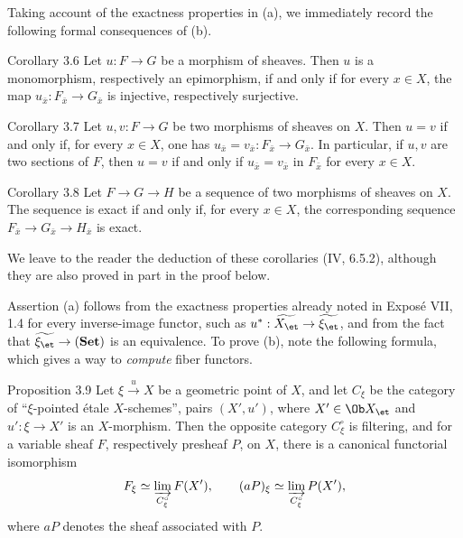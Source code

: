 Taking account of the exactness properties in (a), we immediately record the following formal consequences of (b).

\begin{statement}{Corollary 3.6}
Let \(u:F\to G\) be a morphism of sheaves. Then \(u\) is a monomorphism, respectively an epimorphism, if and only if for every \(x\in X\), the map \(u_{\bar x}:F_{\bar x}\to G_{\bar x}\) is injective, respectively surjective.
\end{statement}

\begin{statement}{Corollary 3.7}
Let \(u,v:F\to G\) be two morphisms of sheaves on \(X\). Then \(u=v\) if and only if, for every \(x\in X\), one has \(u_{\bar x}=v_{\bar x}:F_{\bar x}\to G_{\bar x}\). In particular, if \(u,v\) are two sections of \(F\), then \(u=v\) if and only if \(u_{\bar x}=v_{\bar x}\) in \(F_{\bar x}\) for every \(x\in X\).
\end{statement}

\begin{statement}{Corollary 3.8}
Let \(F\to G\to H\) be a sequence of two morphisms of sheaves on \(X\). The sequence is exact if and only if, for every \(x\in X\), the corresponding sequence \(F_{\bar x}\to G_{\bar x}\to H_{\bar x}\) is exact.
\end{statement}

We leave to the reader the deduction of these corollaries (\cf IV, 6.5.2), although they are also proved in part in the proof below.

Assertion (a) follows from the exactness properties already noted in Expos\'e VII, 1.4 for every inverse-image functor, such as \(u^*:\widetilde{X_{\et}}\to\widetilde{\xi_{\et}}\), and from the fact that \(\widetilde{\xi_{\et}}\to(\mathbf{Set})\) is an equivalence. To prove (b), note the following formula, which gives a way to \emph{compute} fiber functors.

\begin{statement}{Proposition 3.9}
Let \(\xi\xrightarrow{u}X\) be a geometric point of \(X\), and let \(C_\xi\) be the category of ``\(\xi\)-pointed \'etale \(X\)-schemes'', \ie pairs \((X',u')\), where \(X'\in\Ob X_{\et}\) and \(u':\xi\to X'\) is an \(X\)-morphism. Then the opposite category \(C_\xi^\circ\) is filtering, and for a variable sheaf \(F\), respectively presheaf \(P\), on \(X\), there is a canonical functorial isomorphism
\[
F_\xi\simeq \varinjlim_{C_\xi^\circ}F(X'),\qquad
(aP)_\xi\simeq \varinjlim_{C_\xi^\circ}P(X'),
\]
where \(aP\) denotes the sheaf associated with \(P\).
\end{statement}

